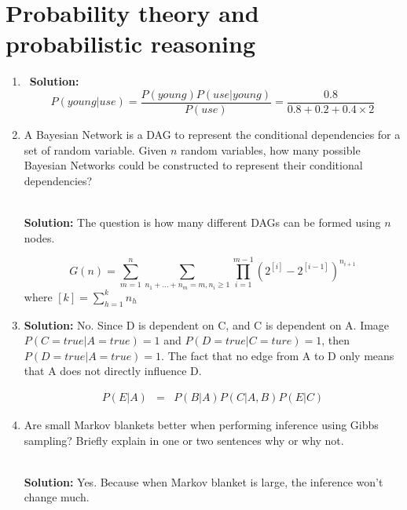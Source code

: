 
\section{Probability theory and probabilistic reasoning}

\begin{enumerate}
\item 
\ {\bf Solution:}
\[
P(young|use) = \frac{P(young)P(use|young)}{P(use)} = \frac{0.8}{0.8+0.2+0.4\times2}
\]
\item A Bayesian Network is a DAG to represent the conditional dependencies for a set of random variable. Given $n$ random variables, how many possible Bayesian Networks could be constructed to represent their conditional dependencies?

\ \\{\bf Solution:} The question is how many different DAGs can be formed using $n$ nodes. %

\[
G(n)=\sum_{m=1}^n \sum_{n_1+\dots+n_m=m,n_i\ge1} \prod_{i=1}^{m-1} (2^{[i]}-2^{[i-1]})^{n_{i+1}}
\]
where $[k]=\sum_{h=1}^k n_h$

\item {\bf Solution:} No. Since D is dependent on C, and C is dependent on A. Image $P(C=true|A=true)=1$ and $P(D=true|C=ture)=1$, then $P(D=true|A=true) = 1$. The fact that no edge from A to D only means that A does not directly influence D.

\begin{eqnarray*}
P(E|A) &=& P(B|A) P(C|A,B) P(E|C)
\end{eqnarray*}

\item Are small Markov blankets better when performing inference using Gibbs sampling? Briefly explain in one or two sentences why or why not.

\ \\{\bf Solution:} Yes. Because when Markov blanket is large, the inference won't change much.
\end{enumerate}